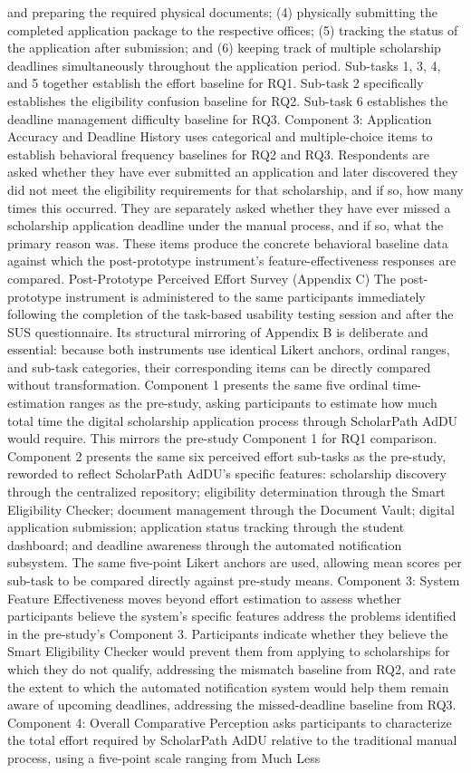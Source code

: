and preparing the required physical documents; (4) physically submitting the completed application package to the respective offices; (5) tracking the status of the application after submission; and (6) keeping track of multiple scholarship deadlines simultaneously throughout the application period. Sub-tasks 1, 3, 4, and 5 together establish the effort baseline for RQ1. Sub-task 2 specifically establishes the eligibility confusion baseline for RQ2. Sub-task 6 establishes the deadline management difficulty baseline for RQ3. Component 3: Application Accuracy and Deadline History uses categorical and multiple-choice items to establish behavioral frequency baselines for RQ2 and RQ3. Respondents are asked whether they have ever submitted an application and later discovered they did not meet the eligibility requirements for that scholarship, and if so, how many times this occurred. They are separately asked whether they have ever missed a scholarship application deadline under the manual process, and if so, what the primary reason was. These items produce the concrete behavioral baseline data against which the post-prototype instrument's feature-effectiveness responses are compared. Post-Prototype Perceived Effort Survey (Appendix C) The post-prototype instrument is administered to the same participants immediately following the completion of the task-based usability testing session and after the SUS questionnaire. Its structural mirroring of Appendix B is deliberate and essential: because both instruments use identical Likert anchors, ordinal ranges, and sub-task categories, their corresponding items can be directly compared without transformation. Component 1 presents the same five ordinal time-estimation ranges as the pre-study, asking participants to estimate how much total time the digital scholarship application process through ScholarPath AdDU would require. This mirrors the pre-study Component 1 for RQ1 comparison. Component 2 presents the same six perceived effort sub-tasks as the pre-study, reworded to reflect ScholarPath AdDU's specific features: scholarship discovery through the centralized repository; eligibility determination through the Smart Eligibility Checker; document management through the Document Vault; digital application submission; application status tracking through the student dashboard; and deadline awareness through the automated notification subsystem. The same five-point Likert anchors are used, allowing mean scores per sub-task to be compared directly against pre-study means. Component 3: System Feature Effectiveness moves beyond effort estimation to assess whether participants believe the system's specific features address the problems identified in the pre-study's Component 3. Participants indicate whether they believe the Smart Eligibility Checker would prevent them from applying to scholarships for which they do not qualify, addressing the mismatch baseline from RQ2, and rate the extent to which the automated notification system would help them remain aware of upcoming deadlines, addressing the missed-deadline baseline from RQ3. Component 4: Overall Comparative Perception asks participants to characterize the total effort required by ScholarPath AdDU relative to the traditional manual process, using a five-point scale ranging from Much Less 